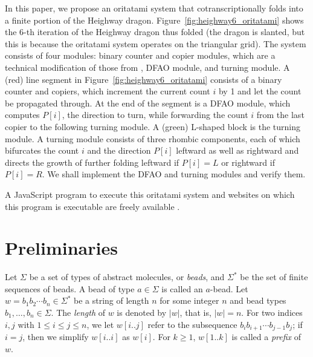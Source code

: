 \documentclass{article}
\theoremstyle{remark}
\begin{document}
In this paper, we propose an oritatami system that cotranscriptionally folds into a finite portion of the Heighway dragon. 
Figure~\ref{fig:heighway6_oritatami} shows the 6-th iteration of the Heighway dragon thus folded (the dragon is slanted, but this is because the oritatami system operates on the triangular grid). 
The system consists of four modules: binary counter and copier modules, which are a technical modification of those from \cite{GeMeScSe2016}, DFAO module, and turning module. 
A (red) line segment in Figure~\ref{fig:heighway6_oritatami} consists of a binary counter and copiers, which increment the current count $i$ by 1 and let the count be propagated through. 
At the end of the segment is a DFAO module, which computes $P[i]$, the direction to turn, while forwarding the count $i$ from the last copier to the following turning module. 
A (green) L-shaped block is the turning module. 
A turning module consists of three rhombic components, each of which bifurcates the count $i$ and the direction $P[i]$ leftward as well as rightward and directs the growth of further folding leftward if $P[i] = L$ or rightward if $P[i] = R$. 
We shall implement the DFAO and turning modules and verify them. 

A JavaScript program to execute this oritatami system and websites on which this program is executable are freely available \cite{heighway_web}. 

	\section{Preliminaries}

Let $\Sigma$ be a set of types of abstract molecules, or \textit{beads}, and $\Sigma^*$ be the set of finite sequences of beads. 
A bead of type $a \in \Sigma$ is called an $a$-bead. 
Let $w = b_1 b_2\cdots b_n \in \Sigma^*$ be a string of length $n$ for some integer $n$ and bead types $b_1, \ldots, b_n \in \Sigma$.
The \textit{length} of $w$ is denoted by $|w|$, that is, $|w| = n$. 
For two indices $i,j$ with $1\leq i \leq j \leq n$, we let $w[i..j]$ refer to the subsequence $b_i b_{i+1} \cdots b_{j-1} b_{j}$; if $i=j$, then we simplify $w[i..i]$ as $w[i]$.
For $k \ge 1$, $w[1..k]$ is called a \textit{prefix} of $w$. 
\end{document}
